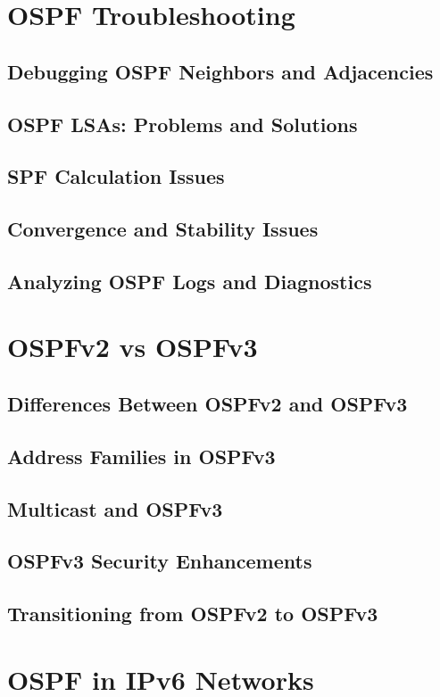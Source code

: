 \documentclass{book}
\begin{document}
\chapter{OSPF Troubleshooting}
    \section{Debugging OSPF Neighbors and Adjacencies}
    \section{OSPF LSAs: Problems and Solutions}
    \section{SPF Calculation Issues}
    \section{Convergence and Stability Issues}
    \section{Analyzing OSPF Logs and Diagnostics}
    
\chapter{OSPFv2 vs OSPFv3}
    \section{Differences Between OSPFv2 and OSPFv3}
    \section{Address Families in OSPFv3}
    \section{Multicast and OSPFv3}
    \section{OSPFv3 Security Enhancements}
    \section{Transitioning from OSPFv2 to OSPFv3}
    
\chapter{OSPF in IPv6 Networks}
\end{document}
